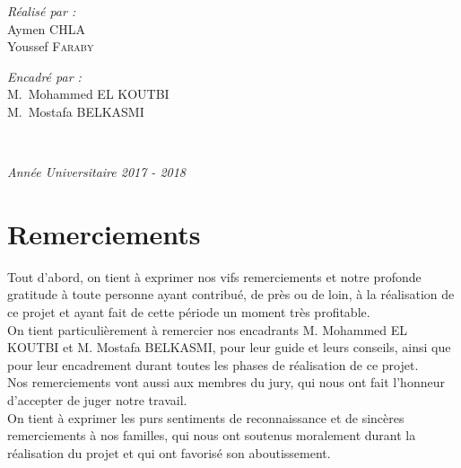 \documentclass[12pt,a4paper]{report}
\makeatletter
\newcommand\mainmatter{%
	\cleardoublepage
	\pagenumbering{arabic}}
\makeatother
\begin{document}
\begin{titlepage}
\begin{center}
		\noindent
		\begin{minipage}{0.4\textwidth}
		  \begin{flushleft} \small
		    \emph{Réalisé par :}\\
		
		      Aymen \textsc{CHLA}\\
		      Youssef \textsc{Faraby}\\
		  \end{flushleft}
		\end{minipage}%
		\begin{minipage}{0.4\textwidth}
		  \begin{flushright} \small
		    \emph{Encadré par :} \\
		    M.~Mohammed \textsc{EL KOUTBI}\\
		    M.~Mostafa \textsc{BELKASMI}\\  
		  \end{flushright}
		\end{minipage}\\[4cm]

		\vfill

		{\large \slshape Année Universitaire 2017 - 2018}

		\end{center}
	\end{titlepage}
	
	\restoregeometry
	\normalsize
	\clearpage
	\mainmatter


	\begingroup
	  \pagestyle{empty}
	  \null
	  \newpage
	\endgroup
	
	
	

	\chapter*{Remerciements}
	
Tout d’abord, on tient à exprimer nos vifs remerciements et notre profonde gratitude à toute personne ayant contribué, de près ou de loin, à la réalisation de ce projet et ayant fait de cette période un moment très profitable.\\
	\newline 
On tient particulièrement à remercier nos encadrants M. Mohammed EL KOUTBI et M. Mostafa BELKASMI, pour leur guide et leurs conseils, ainsi que pour leur encadrement durant toutes les phases de réalisation de ce projet.\\
	\newline
Nos remerciements vont aussi aux membres du jury, qui nous ont fait l'honneur d'accepter de juger notre travail.\\
	\newline
On tient à exprimer les purs sentiments de reconnaissance et de sincères remerciements à nos familles, qui nous ont soutenus moralement durant la réalisation du projet et qui ont favorisé son aboutissement.\\
\end{document}

